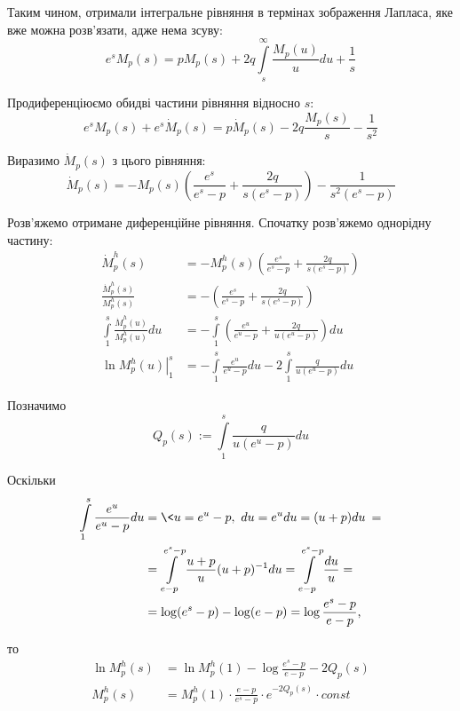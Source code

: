 Таким чином, отримали інтегральне рівняння в термінах зображення Лапласа, яке вже можна розв'язати, адже нема зсуву:
\begin{equation}
\label{eq:model_laplace_integral}
e^s M_{p}(s) = p M_{p}(s) + 2q \int\limits_s^\infty \frac{M_{p}(u)}{u} du + \frac{1}{s}
\end{equation}

Продиференціюємо обидві частини рівняння відносно $s$:
\begin{equation}
e^s M_{p}(s) + e^s \dot M_{p}(s) =p \dot M_{p}(s) - 2 q \frac{M_{p}(s)}{s}  - \frac1{s^2}
\end{equation}

Виразимо $\dot M_{p}(s)$ з цього рівняння:
\begin{equation}
\label{eq:model_laplace_diff}
\dot M_{p}(s) = - M_{p}(s)\left(\frac{e^s}{e^s - p} + \frac{2q}{s(e^s - p)}\right) - \frac{1}{s^2(e^s - p)}
\end{equation}

Розв'яжемо отримане диференційне рівняння. Спочатку розв'яжемо однорідну частину:
\begin{align*}
\dot M_{p}^{h} (s) &= - M_{p}^{h} (s)\left(\frac{e^s}{e^s - p} + \frac{2q}{s(e^s - p)}\right) \\
\frac{\dot M_{p}^{h} (s)}{M_{p}^{h} (s)} &= -\left(\frac{e^s}{e^s - p} + \frac{2q}{s(e^s - p)}\right) \\
\int\limits_1^s \frac{\dot M_{p}^{h} (u)}{M_{p}^{h} (u)} du &= -\int\limits_1^s \left(\frac{e^u}{e^u - p} + \frac{2q}{u(e^u - p)}\right) du \\
\left. \ln{M_{p}^{h} (u)}\right|_1^s &= - \int\limits_1^s \frac{e^u}{e^u - p} du  - 2 \int\limits_1^s \frac{q}{u(e^u - p)} du
\end{align*}

Позначимо
\begin{equation}
\label{eq:partial_li_p}
Q_p(s) := \int\limits_1^s \frac{q}{u(e^u - p)} du
\end{equation}

Оскільки
\begin{align*}
\int\limits_1^s \frac{e^u}{e^u - p} du &= \< u = e^u - p,~ du = e^u du = (u+p) du \> = \\
&= \int\limits_{e-p}^{e^s -p} \frac{u + p}{u} (u+p)^{-1} du = 
\int\limits_{e-p}^{e^s -p} \frac{du}{u} = \\
&= \log(e^s - p) - \log(e-p) = \log \frac{e^s - p}{e - p} \text{,}
\end{align*}

то
\begin{align*}
\ln{M_{p}^{h} (s)} &= \ln{M_{p}^{h} (1)} - \log \frac{e^s - p}{e - p} - 2Q_p(s) \\
M_{p}^{h} (s) &= M_{p}^{h} (1) \cdot \frac{e - p}{e^s - p} \cdot e^{- 2Q_p(s)} \cdot const
\end{align*}

